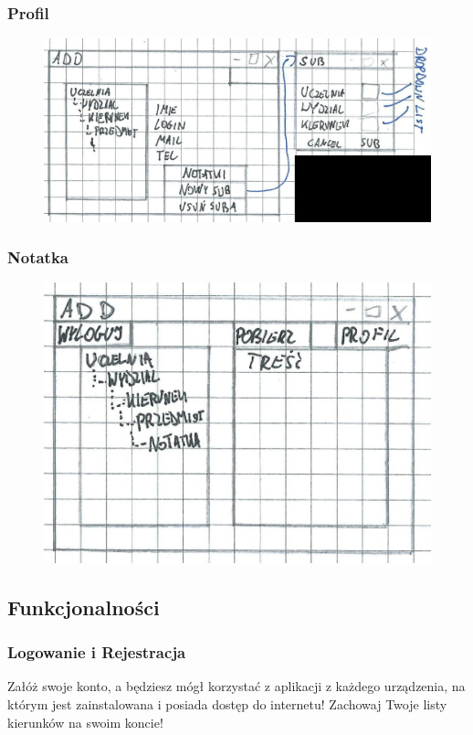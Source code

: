 \documentclass[12pt,a4paper]{article}
\begin{document}
			\subsubsection{Profil}
				\begin{figure}[H]
					\centering
					\includegraphics[]{profil}
				\end{figure}
			\subsubsection{Notatka}
				\begin{figure}[H]
					\centering
					\includegraphics[]{notka}
				\end{figure}
\clearpage	\subsection{Funkcjonalności}
			\subsubsection{Logowanie i Rejestracja}
				Załóż swoje konto, a będziesz mógł korzystać z aplikacji z każdego urządzenia, na którym jest zainstalowana i posiada dostęp do internetu! Zachowaj Twoje listy kierunków na swoim koncie!
\end{document}

